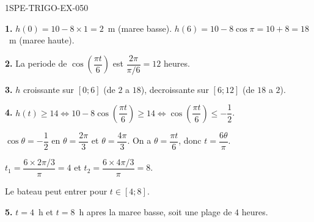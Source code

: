 \begin{corrige}{1SPE-TRIGO-EX-050}

\textbf{1.} $h(0) = 10 - 8 \times 1 = 2$~m (maree basse). $h(6) = 10 - 8\cos\pi = 10 + 8 = 18$~m (maree haute).

\textbf{2.} La periode de $\cos\!\left(\dfrac{\pi t}{6}\right)$ est $\dfrac{2\pi}{\pi/6} = 12$ heures.

\textbf{3.} $h$ croissante sur $[0;6]$ (de $2$ a $18$), decroissante sur $[6;12]$ (de $18$ a $2$).

\textbf{4.} $h(t) \geqslant 14 \iff 10 - 8\cos\!\left(\dfrac{\pi t}{6}\right) \geqslant 14 \iff \cos\!\left(\dfrac{\pi t}{6}\right) \leqslant -\dfrac{1}{2}$.

$\cos\theta = -\dfrac{1}{2}$ en $\theta = \dfrac{2\pi}{3}$ et $\theta = \dfrac{4\pi}{3}$. On a $\theta = \dfrac{\pi t}{6}$, donc $t = \dfrac{6\theta}{\pi}$.

$t_1 = \dfrac{6 \times 2\pi/3}{\pi} = 4$ et $t_2 = \dfrac{6 \times 4\pi/3}{\pi} = 8$.

Le bateau peut entrer pour $t \in [4;8]$.

\textbf{5.} $t = 4$~h et $t = 8$~h apres la maree basse, soit une plage de $4$ heures.

\end{corrige}
